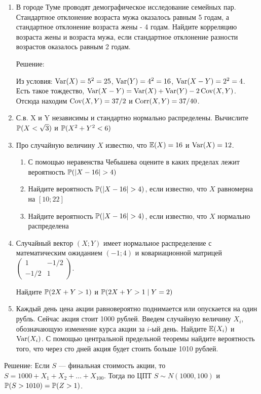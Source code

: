 \documentclass[12pt, a4paper]{article}\usepackage[]{graphicx}\usepackage[]{color}
\begin{document}
\begin{enumerate}
\item В  городе Туме проводят демографическое исследование семейных пар. Стандартное отклонение возраста мужа оказалось равным 5 годам, а стандартное отклонение возраста жены - 4 годам. Найдите корреляцию возраста жены и возраста мужа, если стандартное отклонение разности возрастов оказалось равным 2 годам.


Решение:

Из условия: $\Var(X)=5^2=25$, $\Var(Y)=4^2=16$, $\Var(X-Y)=2^2=4$. Есть такое тождество, $\Var(X-Y)=\Var(X)+\Var(Y)-2\Cov(X,Y)$. Отсюда находим $\Cov(X,Y)=37/2$ и $\Corr(X,Y)=37/40$.

\item С.в. X и Y независимы и стандартно нормально распределены. Вычислите $\P(X<\sqrt{3})$ и $\P(X^2+Y^2<6)$

\item  Про случайную величину $X$ известно, что $\E(X)=16$ и $\Var(X)=12$.
\begin{enumerate}
\item С помощью неравенства Чебышева оцените в каких пределах лежит вероятность $\P(|X-16|>4)$
\item Найдите вероятность $\P(|X-16|>4)$, если известно, что $X$ равномерна на $[10;22]$
\item Найдите вероятность $\P(|X-16|>4)$, если известно, что $X$ нормально распределена
\end{enumerate}


\item Случайный вектор $(X;Y)$ имеет нормальное распределение с математическим ожиданием $(-1;4)$ и ковариационной матрицей $\left( \begin{array}{cc}
1 & -1/2 \\
-1/2 & 1
\end{array} \right)$.


Найдите   $\P(2X+Y>1)$ и $\P(2X+Y>1 \mid Y=2)$

\item Каждый день цена акции равновероятно поднимается или опускается на один рубль. Сейчас акция стоит 1000 рублей. Введем случайную величину $X_i$, обозначающую изменение курса акции за $i$-ый день. Найдите $\E(X_i)$  и $\Var(X_i)$. С помощью центральной предельной теоремы найдите вероятность того, что через сто дней акция будет стоить больше 1010 рублей.
\end{enumerate}

Решение: Если $S$ — финальная стоимость акции, то $S=1000+X_1+X_2+\ldots+X_{100}$. Тогда по ЦПТ $S\sim N(1000,100)$ и $\P(S>1010)=\P(Z>1)$.
\end{document}
